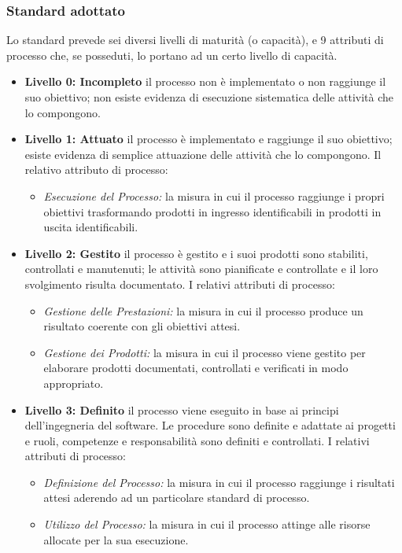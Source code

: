 		\subsubsection{Standard adottato}
		Lo standard prevede sei diversi livelli di maturità (o capacità), e 9 attributi di processo che, se posseduti, lo portano ad un certo livello di 			capacità.
		\begin{itemize}
		\item \textbf{Livello 0: Incompleto} il processo non è implementato o non raggiunge il suo obiettivo;   non esiste evidenza di esecuzione 					sistematica delle attività che lo compongono.
		 \item \textbf{Livello 1: Attuato} il processo è implementato e raggiunge il suo obiettivo; esiste evidenza di semplice attuazione delle attività 			che lo compongono.
		Il relativo attributo di processo:
			\begin{itemize}
				\item \emph{Esecuzione del Processo:} la misura in cui il processo raggiunge i propri obiettivi trasformando   prodotti in ingresso 						identificabili in prodotti in uscita identificabili.
			\end{itemize}
		\item \textbf{Livello 2: Gestito} il processo è gestito e i suoi prodotti sono stabiliti, controllati e manutenuti; le attività sono pianificate e 			controllate e il loro svolgimento risulta documentato.
		I relativi attributi di processo:
			\begin{itemize}
				\item \emph{Gestione delle Prestazioni:} la misura in cui il processo produce un risultato coerente con gli obiettivi attesi.
				\item \emph{Gestione dei Prodotti:} la misura in cui il processo viene gestito per elaborare prodotti documentati, controllati e verificati in modo appropriato.
			\end{itemize}
 	
		\item \textbf{Livello 3: Definito} il processo viene eseguito in base ai principi dell'ingegneria del software. Le procedure sono definite e adattate ai progetti e ruoli, competenze e responsabilità sono definiti e controllati.
		I relativi attributi di processo:
			\begin{itemize}
				\item \emph{Definizione del Processo:} la misura in cui il processo raggiunge i risultati attesi aderendo ad un particolare standard di processo.
				\item \emph{Utilizzo del Processo:} la misura in cui il processo attinge alle risorse allocate per la sua esecuzione.	
			\end{itemize}
			

\end{itemize}

